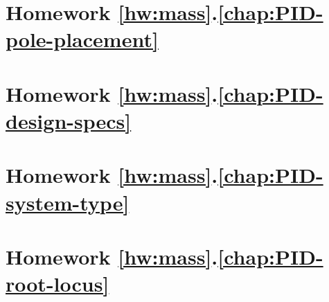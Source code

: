 	\section*{
		Homework \ref{hw:mass}.\ref{chap:PID-pole-placement}}  \label{hw:mass_pd_pole_placement}
		
	\section*{
		Homework \ref{hw:mass}.\ref{chap:PID-design-specs}}  \label{hw:mass_time_spec}
		
	\section*{
		Homework \ref{hw:mass}.\ref{chap:PID-system-type}}  \label{hw:mass_system_type}
		
	\section*{
		Homework \ref{hw:mass}.\ref{chap:PID-root-locus}}  \label{hw:mass_root_locus_PID}
		

